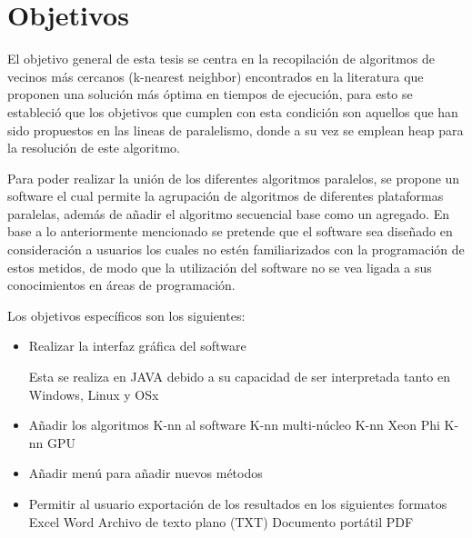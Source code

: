 \section{Objetivos}

El objetivo general de esta tesis se centra en la recopilación de algoritmos de vecinos más cercanos (k-nearest neighbor) encontrados en la literatura que proponen una solución más óptima en tiempos de ejecución, para esto se estableció que los objetivos que cumplen con esta condición son aquellos que han sido propuestos en las lineas de paralelismo, donde a su vez se emplean heap para la resolución de este algoritmo.

Para poder realizar la unión de los diferentes algoritmos paralelos, se propone un software el cual permite la agrupación de algoritmos de diferentes plataformas paralelas, además de añadir el algoritmo secuencial base como un agregado. En base a lo anteriormente mencionado se pretende que el software sea diseñado en consideración a usuarios los cuales no estén familiarizados con la programación de estos metidos, de modo que la utilización del software no se vea ligada a sus conocimientos en áreas de programación.


Los objetivos específicos son los siguientes:

\begin{itemize}

\item Realizar la interfaz gráfica del software

	\subitem Esta se realiza en JAVA debido a su capacidad de ser interpretada tanto en Windows, Linux y OSx
\item Añadir los algoritmos K-nn al software
	\subitem K-nn multi-núcleo
	\subitem K-nn Xeon Phi
	\subitem K-nn GPU
	 
\item Añadir menú para añadir nuevos métodos

\item Permitir al usuario exportación de los resultados en los siguientes formatos
	\subitem Excel
	\subitem Word
	\subitem Archivo de texto plano (TXT)
	\subitem Documento portátil PDF
	
\end{itemize}



